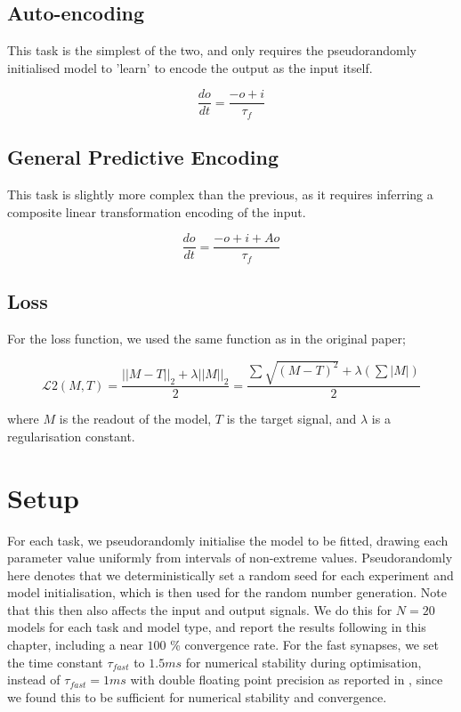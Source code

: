\documentclass[mphil,deptreport,ianc]{infthesis} %
\begin{document}
\subsection{Auto-encoding}

This task is the simplest of the two, and only requires the pseudorandomly initialised model to 'learn' to encode the output as the input itself.

\begin{equation}
    \frac{do}{dt} = \frac{-o + i}{\tau_f}
\end{equation}

\subsection{General Predictive Encoding}

This task is slightly more complex than the previous, as it requires inferring a composite linear transformation encoding of the input.

\begin{equation}
    \frac{do}{dt} = \frac{- o + i + Ao}{\tau_f}
\end{equation}


\subsection{Loss}

For the loss function, we used the same function as in the original paper;

\begin{equation}
    \mathcal{L} 2(M, T) = \frac{||M-T||_2 + \lambda ||M||_2}{2} = \frac{\sum \sqrt{(M-T)^2} + \lambda(\sum |M|)}{2}
\end{equation}

where $M$ is the readout of the model, $T$ is the target signal, and $\lambda$ is a regularisation constant.


\section{Setup}

For each task, we pseudorandomly initialise the model to be fitted, drawing each parameter value uniformly from intervals of non-extreme values.
Pseudorandomly here denotes that we deterministically set a random seed for each experiment and model initialisation, which is then used for the random number generation.
Note that this then also affects the input and output signals.
We do this for $N=20$ models for each task and model type, and report the results following in this chapter, including a near $100$ \% convergence rate.
For the fast synapses, we set the time constant $\tau_{fast}$ to $1.5 \si{ms}$ for numerical stability during optimisation, instead of $\tau_{fast}=1 \si{ms}$ with double floating point precision as reported in \cite{Huh2017}, since we found this to be sufficient for numerical stability and convergence. 
\end{document}
